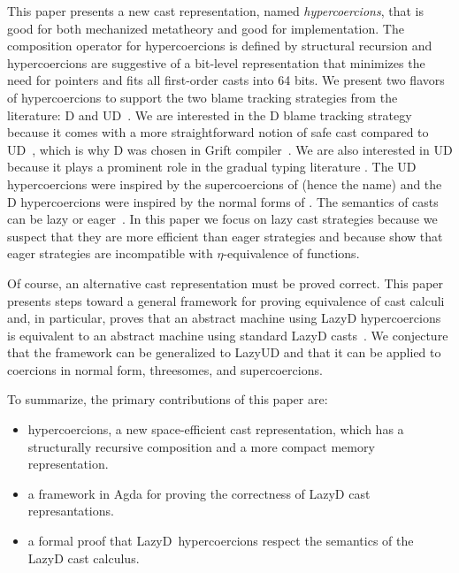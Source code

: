 \documentclass[acmsmall,review,anonymous]{acmart}\settopmatter{printfolios=true,printccs=false,printacmref=false}
\newcommand{\lazyUD}{Lazy\;UD}
\newcommand{\lazyD}{Lazy\;D}
\begin{document}
This paper presents a new cast representation, named
\emph{hypercoercions}, that is good for both mechanized metatheory and
good for implementation. The composition operator for hypercoercions
is defined by structural recursion and hypercoercions are suggestive
of a bit-level representation that minimizes the need for pointers and
fits all first-order casts into 64 bits.
%
We present two flavors of hypercoercions to support the two blame
tracking strategies from the literature: D and
UD~\citep{siek2009exploring}. We are interested in the D blame
tracking strategy because it comes with a more straightforward notion of
safe cast compared to UD~\citep{siek2009exploring}, which is why D was
chosen in Grift compiler~\citep{kuhlenschmidt2018efficient}. We are also 
interested in UD because it plays a
prominent role in the gradual typing literature
\citep{wadler2009well}.  The UD hypercoercions were inspired by the
supercoercions of \citet{garcia2013calculating} (hence the name) and
the D hypercoercions were inspired by the normal forms of
\citet{siek2012interpretations}.
%
The semantics of casts can be lazy or
eager~\citep{siek2009exploring}. In this paper we focus on lazy cast
strategies because we suspect that they are more efficient than eager
strategies and because \citet{new2019gradual} show that eager
strategies are incompatible with $\eta$-equivalence of functions.

Of course, an alternative cast representation must be proved
correct. This paper presents steps toward a general framework for
proving equivalence of cast calculi and, in particular, proves that an
abstract machine using \lazyD{} hypercoercions is equivalent to an
abstract machine using standard \lazyD{}
casts~\citep{siek2009exploring}. We conjecture that the framework can
be generalized to \lazyUD{} and that it can be applied to coercions in
normal form, threesomes, and supercoercions.

To summarize, the primary contributions of this paper are:
\begin{itemize}
\item hypercoercions, a new space-efficient cast representation, which
  has a structurally recursive composition and a more compact memory
  representation.
\item a framework in Agda for proving the correctness of \lazyD{} cast
  represantations.
\item a formal proof that \lazyD\ hypercoercions respect the semantics
  of the \lazyD{} cast calculus.
\end{itemize}
\end{document}
